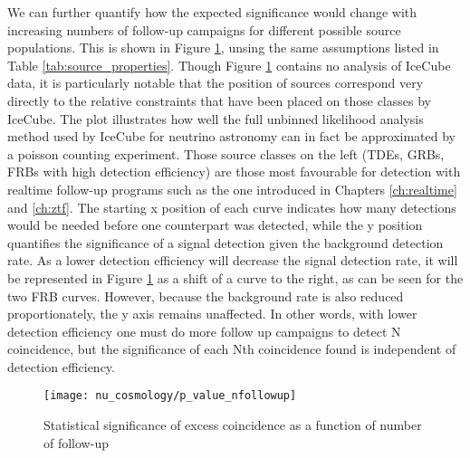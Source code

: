 We can further quantify how the expected significance would change with increasing numbers of follow-up campaigns for different possible source populations. This is shown in Figure \ref{fig:p_value}, unsing the same assumptions listed in Table \ref{tab:source_properties}. Though Figure \ref{fig:p_value} contains no analysis of IceCube data, it is particularly notable that the position of sources correspond very directly to the relative constraints that have been placed on those classes by IceCube. The plot illustrates how well the full unbinned likelihood analysis method used by IceCube for neutrino astronomy can in fact be approximated by a poisson counting experiment. Those source classes on the left (TDEs, GRBs, FRBs with high detection efficiency) are those most favourable for detection with realtime follow-up programs such as the one introduced in Chapters \ref{ch:realtime} and \ref{ch:ztf}. 
The starting x position of each curve indicates how many detections would be needed before one counterpart was detected, while the y position quantifies the significance of a signal detection given the background detection rate. As a lower detection efficiency will decrease the signal detection rate,  it will be represented in Figure \ref{fig:p_value} as a shift of a curve to the right,  as can be seen for the two FRB curves. However, because the background rate is also reduced proportionately, the y axis remains unaffected. In other words, with lower detection efficiency one must do more follow up campaigns to detect N coincidence, but the significance of each Nth coincidence found is independent of detection efficiency.

\begin{figure}[!ht]
	\centering \texttt{[image: nu\_cosmology/p\_value\_nfollowup]}
	\caption{Statistical significance of excess coincidence as a function of number of follow-up}
	\label{fig:p_value}
\end{figure}
